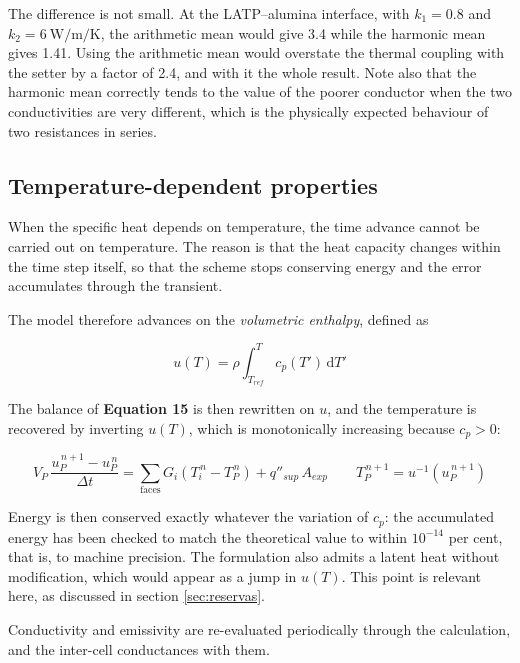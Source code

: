 \documentclass[11pt,a4paper]{article}
\newcommand{\ecu}[1]{\textbf{\textcolor{uji}{Equation #1}}}
\begin{document}
The difference is not small. At the LATP--alumina interface, with
$k_1 = \num{0.8}$ and $k_2 = \SI{6}{\watt\per\meter\per\kelvin}$, the
arithmetic mean would give \num{3.4} while the harmonic mean gives
\num{1.41}. Using the arithmetic mean would overstate the thermal coupling
with the setter by a factor of \num{2.4}, and with it the whole result.
Note also that the harmonic mean correctly tends to the value of the poorer
conductor when the two conductivities are very different, which is the
physically expected behaviour of two resistances in series.

\subsection{Temperature-dependent properties}
\label{sec:entalpia}

When the specific heat depends on temperature, the time advance cannot be
carried out on temperature. The reason is that the heat capacity changes
within the time step itself, so that the scheme stops conserving energy and
the error accumulates through the transient.

The model therefore advances on the \emph{volumetric enthalpy}, defined as

\begin{equation}
u(T) = \rho \int_{T_{ref}}^{T} c_p(T')\, \mathrm{d}T'
\end{equation}

The balance of \ecu{15} is then rewritten on $u$, and the temperature is
recovered by inverting $u(T)$, which is monotonically increasing because
$c_p > 0$:

\begin{equation}
V_{P}\, \frac{u_{P}^{\,n+1} - u_{P}^{\,n}}{\Delta t}
= \sum_{\text{faces}} G_{i} \left( T_{i}^{\,n} - T_{P}^{\,n} \right)
+ q''_{sup}\, A_{exp}
\qquad
T_{P}^{\,n+1} = u^{-1}\!\left( u_{P}^{\,n+1} \right)
\end{equation}

Energy is then conserved exactly whatever the variation of $c_p$: the
accumulated energy has been checked to match the theoretical value to
within $10^{-14}$ per cent, that is, to machine precision. The formulation
also admits a latent heat without modification, which would appear as a
jump in $u(T)$. This point is relevant here, as discussed in
section \ref{sec:reservas}.

Conductivity and emissivity are re-evaluated periodically through the
calculation, and the inter-cell conductances with them.
\end{document}
